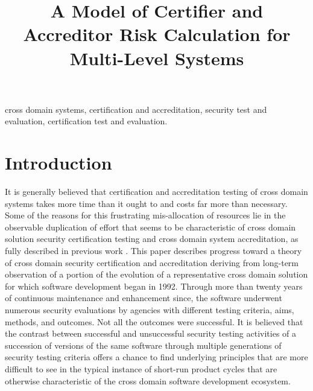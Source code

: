 \documentclass[10pt,letterpaper,conference]{IEEEtran}
\begin{document}
\title{A Model of Certifier and Accreditor Risk Calculation for Multi-Level Systems}

\author{
}

\maketitle

\begin{abstract}
	
\end{abstract}

\def\IEEEkeywordsname{Index Terms}


\begin{IEEEkeywords}
	cross domain systems, certification and accreditation,
	security test and evaluation, certification test and evaluation.
\end{IEEEkeywords}

\IEEEpeerreviewmaketitle

\section{Introduction}

It is generally believed that
certification and accreditation testing of cross domain systems takes more time than it ought
to and costs far more than necessary.  Some of the reasons for this frustrating mis-allocation
of resources lie in the observable duplication of effort that seems to be characteristic of
cross domain solution security certification testing and cross domain system accreditation, as
fully described in previous work \cite{Loughry2010a,Loughry2012a}.  This paper describes progress
toward a theory of cross domain security certification and accreditation deriving from long-term
observation of a portion of the evolution of a representative cross domain solution for which
software development began in 1992.  Through more than twenty years of continuous maintenance and
enhancement since, the software underwent numerous security evaluations by agencies with different
testing criteria, aims, methods, and outcomes.  Not all the outcomes were successful.  It is
believed that the contrast between successful and unsuccessful security testing activities of a
succession of versions of the same software through multiple generations of security testing
criteria offers a chance to find underlying principles that are more difficult to see in the typical
instance of short-run product cycles that are otherwise characteristic of the cross domain software
development ecosystem.
\end{document}

